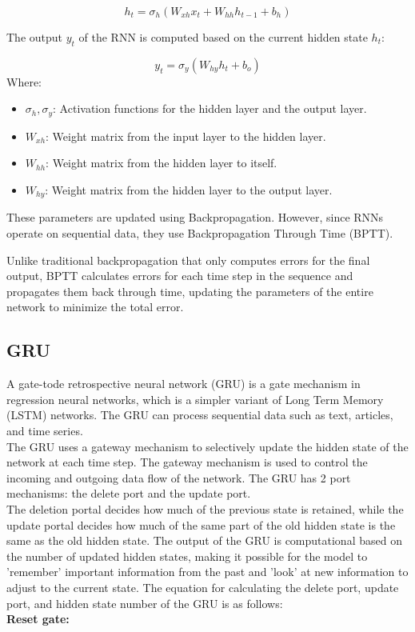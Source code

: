 \documentclass{ieeeojies}
\begin{document}
\[
h_t = \sigma_h(W_{xh} x_t + W_{hh} h_{t-1} + b_h)
\]

The output \( y_t \) of the RNN is computed based on the current hidden state \( h_t \):

\[
y_t = \sigma_y(W_{hy} h_t + b_o)
\]
Where:\\

\begin{itemize}
  \item \( \sigma_h, \sigma_y \): Activation functions for the hidden layer and the output layer.
  \item \( W_{xh} \): Weight matrix from the input layer to the hidden layer.
  \item \( W_{hh} \): Weight matrix from the hidden layer to itself.
  \item \( W_{hy} \): Weight matrix from the hidden layer to the output layer.
\end{itemize}
These parameters are updated using Backpropagation. However, since RNNs operate on sequential data, they use Backpropagation Through Time (BPTT).

Unlike traditional backpropagation that only computes errors for the final output, BPTT calculates errors for each time step in the sequence and propagates them back through time, updating the parameters of the entire network to minimize the total error.


\subsection{GRU}
A gate-tode retrospective neural network (GRU) is a gate mechanism in regression neural networks, which is a simpler variant of Long Term Memory (LSTM) networks. The GRU can process sequential data such as text, articles, and time series.
\\
The GRU uses a gateway mechanism to selectively update the hidden state of the network at each time step. The gateway mechanism is used to control the incoming and outgoing data flow of the network. The GRU has 2 port mechanisms: the delete port and the update port. 
\\
The deletion portal decides how much of the previous state is retained, while the update portal decides how much of the same part of the old hidden state is the same as the old hidden state. The output of the GRU is computational based on the number of updated hidden states, making it possible for the model to 'remember' important information from the past and 'look' at new information to adjust to the current state.
The equation for calculating the delete port, update port, and hidden state number of the GRU is as follows: \\
 \textbf{Reset gate:} 
\end{document}
